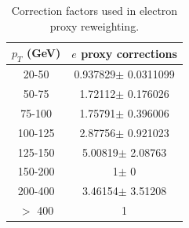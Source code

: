 \begin{table}[htdp]
	\centering
  \begin{tabular}{|c|c|}
  \hline
  $p_T$ (GeV)  & $e$ proxy corrections \\ \hline
  20-50  & 0.937829$\pm$ 0.0311099  \\ \hline
  50-75  & 1.72112$\pm$ 0.176026  \\ \hline
  75-100  & 1.75791$\pm$ 0.396006  \\ \hline
  100-125  & 2.87756$\pm$ 0.921023  \\ \hline
  125-150  & 5.00819$\pm$ 2.08763  \\ \hline
  150-200  & 1$\pm$ 0  \\ \hline
  200-400  & 3.46154$\pm$ 3.51208  \\ \hline
  $>$ 400 & 1 \\ \hline
  \end{tabular}
  \caption{Correction factors used in electron proxy reweighting.}
  \label{table:correctionsfakelep}
\end{table}
